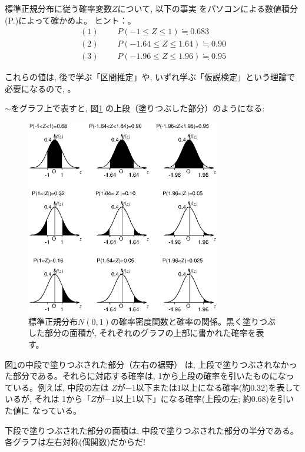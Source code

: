 \begin{q}\label{q:stat_int_normal} 標準正規分布に従う確率変数$Z$について, 以下の事実
をパソコンによる数値積分(P.\pageref{sect:suuchisekibun})によって確かめよ。
ヒント：。
\begin{eqnarray}
(1)\,\,\,\, &&P(-1 \leq Z \leq 1)\fallingdotseq 0.683\label{eq:stat_int_normal1}\\
(2)\,\,\,\, &&P(-1.64\leq Z \le 1.64)\fallingdotseq0.90\label{eq:stat_int_normal2}\\
(3)\,\,\,\, &&P(-1.96\leq Z \le 1.96)\fallingdotseq0.95\label{eq:stat_int_normal3}
\end{eqnarray}\end{q}
これらの値は, 後で学ぶ「区間推定」や, いずれ学ぶ「仮説検定」という理論で必要になるので, 。

$\sim$をグラフ上で表すと, 図\ref{fig:normal_integ}
の上段（塗りつぶした部分）のようになる:
\begin{figure}[h]
    \centering
    \includegraphics[width=8.5cm]{normal_integ.eps}
    \caption{標準正規分布$N(0, 1)$の確率密度関数と確率の関係。黒く塗りつぶした部分の面積が, 
それぞれのグラフの上部に書かれた確率を表す。}\label{fig:normal_integ}
\end{figure}

図\ref{fig:normal_integ}の中段で塗りつぶされた部分（左右の裾野）
は, 上段で塗りつぶされなかった部分である。それらに対応する確率は, 
1から上段の確率を引いたものになっている。例えば, 中段の左は
$Z$が$-1$以下または$1$以上になる確率(約0.32)を表しているが, それは
1から「$Z$が$-1$以上1以下」になる確率(上段の左; 約0.68)を引いた値に
なっている。

下段で塗りつぶされた部分の面積は, 中段で塗りつぶされた部分の半分である。
各グラフは左右対称(偶関数)だからだ!\\

